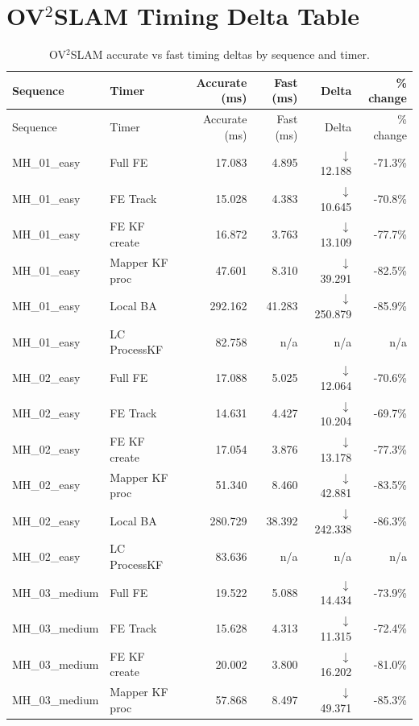 \documentclass[11pt]{article}
\begin{document}
\section{OV$^{2}$SLAM Timing Delta Table}

\begin{longtable}{llrrrr}
\caption{OV$^{2}$SLAM accurate vs fast timing deltas by sequence and timer.}\label{tab:ov2_timing_deltas}\\
\toprule
Sequence & Timer & Accurate (ms) & Fast (ms) & Delta & \% change \\
\midrule
\endfirsthead
\toprule
Sequence & Timer & Accurate (ms) & Fast (ms) & Delta & \% change \\
\midrule
\endhead
\bottomrule
\endfoot
MH\_01\_easy & Full FE & 17.083 & 4.895 & $\downarrow$ 12.188 & -71.3\% \\
MH\_01\_easy & FE Track & 15.028 & 4.383 & $\downarrow$ 10.645 & -70.8\% \\
MH\_01\_easy & FE KF create & 16.872 & 3.763 & $\downarrow$ 13.109 & -77.7\% \\
MH\_01\_easy & Mapper KF proc & 47.601 & 8.310 & $\downarrow$ 39.291 & -82.5\% \\
MH\_01\_easy & Local BA & 292.162 & 41.283 & $\downarrow$ 250.879 & -85.9\% \\
MH\_01\_easy & LC ProcessKF & 82.758 & n/a & n/a & n/a \\
MH\_02\_easy & Full FE & 17.088 & 5.025 & $\downarrow$ 12.064 & -70.6\% \\
MH\_02\_easy & FE Track & 14.631 & 4.427 & $\downarrow$ 10.204 & -69.7\% \\
MH\_02\_easy & FE KF create & 17.054 & 3.876 & $\downarrow$ 13.178 & -77.3\% \\
MH\_02\_easy & Mapper KF proc & 51.340 & 8.460 & $\downarrow$ 42.881 & -83.5\% \\
MH\_02\_easy & Local BA & 280.729 & 38.392 & $\downarrow$ 242.338 & -86.3\% \\
MH\_02\_easy & LC ProcessKF & 83.636 & n/a & n/a & n/a \\
MH\_03\_medium & Full FE & 19.522 & 5.088 & $\downarrow$ 14.434 & -73.9\% \\
MH\_03\_medium & FE Track & 15.628 & 4.313 & $\downarrow$ 11.315 & -72.4\% \\
MH\_03\_medium & FE KF create & 20.002 & 3.800 & $\downarrow$ 16.202 & -81.0\% \\
MH\_03\_medium & Mapper KF proc & 57.868 & 8.497 & $\downarrow$ 49.371 & -85.3\% \\

\end{longtable}
\end{document}
